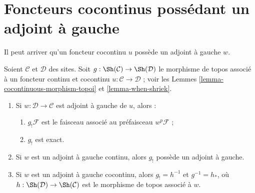\section{Foncteurs cocontinus possédant un adjoint à gauche}
\label{section-cocontinuous-left-adjoint}

\noindent
Il peut arriver qu’un foncteur cocontinu $u$ possède un adjoint à gauche $w$.

\begin{lemma}
\label{lemma-have-left-adjoint}
Soient $\mathcal{C}$ et $\mathcal{D}$ des sites. Soit
$g : \Sh(\mathcal{C}) \to \Sh(\mathcal{D})$ le morphisme de topos
associé à un foncteur continu et cocontinu
$u : \mathcal{C} \to \mathcal{D}$ ; voir les
Lemmes \ref{lemma-cocontinuous-morphism-topoi} et
\ref{lemma-when-shriek}.
\begin{enumerate}
\item Si $w : \mathcal{D} \to \mathcal{C}$ est adjoint à gauche de $u$, alors :
\begin{enumerate}
\item $g_!\mathcal{F}$ est le faisceau associé au préfaisceau
$w^p\mathcal{F}$ ;
\item $g_!$ est exact.
\end{enumerate}
\item Si $w$ est un adjoint à gauche continu, alors $g_!$
possède un adjoint à gauche.
\item Si $w$ est un adjoint à gauche cocontinu, alors $g_! = h^{-1}$ et
$g^{-1} = h_*$, où $h : \Sh(\mathcal{D}) \to \Sh(\mathcal{C})$ est
le morphisme de topos associé à $w$.
\end{enumerate}
\end{lemma}

